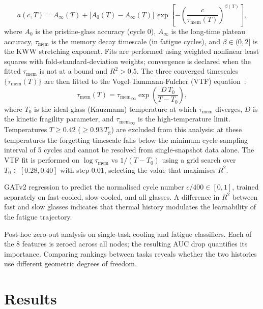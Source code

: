 \documentclass[12pt,a4paper]{article}
\newcommand{\Tg}{T_{\mathrm{g}}}
\newcommand{\vtau}{\tau_{\mathrm{mem}}}
\newcommand{\Tzero}{T_0}
\begin{document}
\begin{description}
\begin{equation}
    a(c, T) = A_\infty(T) + \bigl[A_0(T) - A_\infty(T)\bigr]\,
              \exp\!\left[-\left(\frac{c}{\vtau(T)}\right)^{\!\beta(T)}\right],
    \label{eq:kww}
  \end{equation}
  where $A_0$ is the pristine-glass accuracy (cycle 0), $A_\infty$ is the long-time plateau accuracy, $\vtau$ is the memory decay timescale (in fatigue cycles), and $\beta \in (0, 2]$ is the KWW stretching exponent.
  Fits are performed using weighted nonlinear least squares with fold-standard-deviation weights; convergence is declared when the fitted $\vtau$ is not at a bound and $R^2 > 0.5$.
  The three converged timescales $\{\vtau(T)\}$ are then fitted to the Vogel-Tammann-Fulcher (VTF) equation~\cite{Vogel1921,Fulcher1925,Tammann1926}:
  \begin{equation}
    \vtau(T) = {\vtau}_{\infty} \exp\!\left(\frac{D\,\Tzero}{T - \Tzero}\right),
    \label{eq:vtf}
  \end{equation}
  where $\Tzero$ is the ideal-glass (Kauzmann) temperature at which $\vtau$ diverges, $D$ is the kinetic fragility parameter, and ${\vtau}_{\infty}$ is the high-temperature limit.
  Temperatures $T \geq 0.42$ ($\geq 0.93\,\Tg$) are excluded from this analysis: at these temperatures the forgetting timescale falls below the minimum cycle-sampling interval of 5 cycles and cannot be resolved from single-snapshot data alone.
  The VTF fit is performed on $\log\vtau$ vs $1/(T - \Tzero)$ using a grid search over $\Tzero \in [0.28, 0.40]$ with step $0.01$, selecting the value that maximises $R^2$.
  \item[Exp 5: Fatigue regression.] GATv2 regression to predict the normalised cycle number $c/400 \in [0,1]$, trained separately on fast-cooled, slow-cooled, and all glasses. A difference in $R^2$ between fast and slow glasses indicates that thermal history modulates the learnability of the fatigue trajectory.
  \item[Exp 6: Permutation importance.] Post-hoc zero-out analysis on single-task cooling and fatigue classifiers. Each of the 8 features is zeroed across all nodes; the resulting AUC drop quantifies its importance. Comparing rankings between tasks reveals whether the two histories use different geometric degrees of freedom.
\end{description}

\section{Results}
\label{sec:results}
\end{document}
